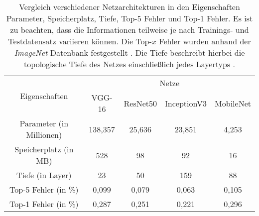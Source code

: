 \begin{table}[H]
	\caption{Vergleich verschiedener Netzarchitekturen in den Eigenschaften Parameter, Speicherplatz, Tiefe, Top-5 Fehler und Top-1 Fehler. Es ist zu beachten, dass die Informationen teilweise je nach Trainings- und Testdatensatz variieren können. Die Top-$x$ Fehler wurden anhand der \textit{ImageNet}-Datenbank festgestellt \cite{keras}. Die Tiefe beschreibt hierbei die topologische Tiefe des Netzes einschließlich jedes Layertyps \cite{keras}.}
	\begin{center}
		\begin{tabular}{|c|c|c|c|c|}
			\hline
			\multirow{2}{*}{Eigenschaften}& \multicolumn{4}{c|}{\centering Netze} \\
			\cline{2-5} & \multicolumn{1}{c|}{VGG-16} & \multicolumn{1}{c|}{ResNet50} & \multicolumn{1}{c|}{InceptionV3} & \multicolumn{1}{c|}{MobileNet} \\ \hline
			Parameter (in Millionen)	& 138,357 	& 25,636 	& 23,851 	& 4,253 \\
			Speicherplatz (in MB)		& 528 		& 98 		& 92 		& 16 \\
			Tiefe (in Layer) 			& 23 		& 50			& 159 		& 88 \\
			Top-5 Fehler (in \%)	& 0,099 	& 0,079 	& 0,063		& 0,105 \\
			Top-1 Fehler (in \%) 	& 0,287 	& 0,251 	& 0,221		& 0,296 \\
			\hline
		\end{tabular}
	\end{center}

	\label{fig: cnnvergleich}
\end{table}